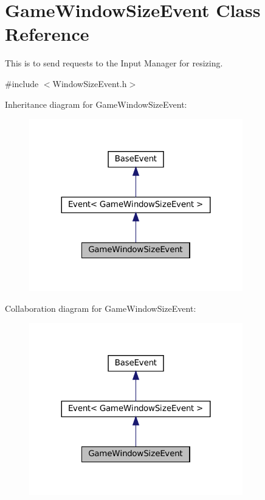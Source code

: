 \hypertarget{classGameWindowSizeEvent}{}\section{Game\+Window\+Size\+Event Class Reference}
\label{classGameWindowSizeEvent}


This is to send requests to the Input Manager for resizing.  




{\ttfamily \#include $<$Window\+Size\+Event.\+h$>$}



Inheritance diagram for Game\+Window\+Size\+Event\+:
\nopagebreak
\begin{figure}[H]
\begin{center}
\leavevmode
\includegraphics[width=263pt]{classGameWindowSizeEvent__inherit__graph}
\end{center}
\end{figure}


Collaboration diagram for Game\+Window\+Size\+Event\+:
\nopagebreak
\begin{figure}[H]
\begin{center}
\leavevmode
\includegraphics[width=263pt]{classGameWindowSizeEvent__coll__graph}
\end{center}
\end{figure}
